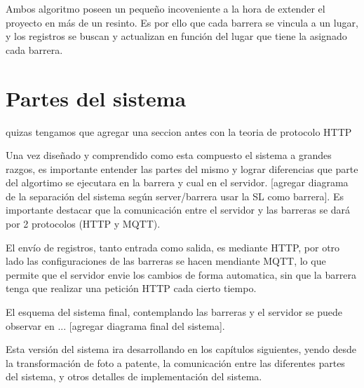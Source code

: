 Ambos algoritmo poseen un pequeño incoveniente a la hora de extender el proyecto en más de un resinto. Es por ello que cada barrera se vincula a un lugar, y los registros se buscan y actualizan en función del lugar que tiene la asignado cada barrera.
\section{Partes del sistema}

 {\huge quizas tengamos que agregar una seccion antes con la teoria de protocolo HTTP}

Una vez diseñado y comprendido como esta compuesto el sistema a grandes razgos, es importante entender las partes del mismo y lograr diferencias que parte del algortimo se ejecutara en la barrera y cual en el servidor. [agregar diagrama de la separación del sistema según server/barrera usar la SL como barrera]. Es importante destacar que la comunicación entre el servidor y las barreras se dará por 2 protocolos (HTTP y MQTT).

El envío de registros, tanto entrada como salida, es mediante HTTP, por otro lado las configuraciones de las barreras se hacen mendiante MQTT, lo que permite que el servidor envie los cambios de forma automatica, sin que la barrera tenga que realizar una petición HTTP cada cierto tiempo.

El esquema del sistema final, contemplando las barreras y el servidor se puede observar en ... [agregar diagrama final del sistema].

Esta versión del sistema ira desarrollando en los capítulos siguientes, yendo desde la transformación de foto a patente, la comunicación entre las diferentes partes del sistema, y otros detalles de implementación del sistema.